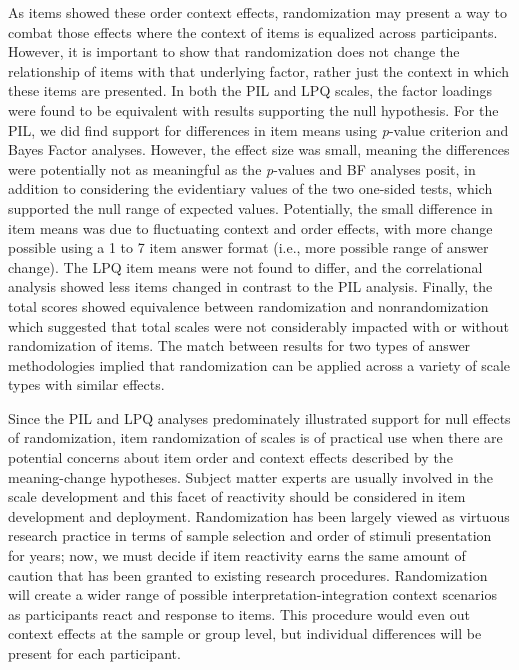\documentclass[english,man, mask]{apa6}
\theoremstyle{definition}
\theoremstyle{definition}
\theoremstyle{definition}
\theoremstyle{remark}
\begin{document}
As items showed these order context effects, randomization may present a
way to combat those effects where the context of items is equalized
across participants. However, it is important to show that randomization
does not change the relationship of items with that underlying factor,
rather just the context in which these items are presented. In both the
PIL and LPQ scales, the factor loadings were found to be equivalent with
results supporting the null hypothesis. For the PIL, we did find support
for differences in item means using \emph{p}-value criterion and Bayes
Factor analyses. However, the effect size was small, meaning the
differences were potentially not as meaningful as the \emph{p}-values
and BF analyses posit, in addition to considering the evidentiary values
of the two one-sided tests, which supported the null range of expected
values. Potentially, the small difference in item means was due to
fluctuating context and order effects, with more change possible using a
1 to 7 item answer format (i.e., more possible range of answer change).
The LPQ item means were not found to differ, and the correlational
analysis showed less items changed in contrast to the PIL analysis.
Finally, the total scores showed equivalence between randomization and
nonrandomization which suggested that total scales were not considerably
impacted with or without randomization of items. The match between
results for two types of answer methodologies implied that randomization
can be applied across a variety of scale types with similar effects.

Since the PIL and LPQ analyses predominately illustrated support for
null effects of randomization, item randomization of scales is of
practical use when there are potential concerns about item order and
context effects described by the meaning-change hypotheses. Subject
matter experts are usually involved in the scale development and this
facet of reactivity should be considered in item development and
deployment. Randomization has been largely viewed as virtuous research
practice in terms of sample selection and order of stimuli presentation
for years; now, we must decide if item reactivity earns the same amount
of caution that has been granted to existing research procedures.
Randomization will create a wider range of possible
interpretation-integration context scenarios as participants react and
response to items. This procedure would even out context effects at the
sample or group level, but individual differences will be present for
each participant.
\end{document}
